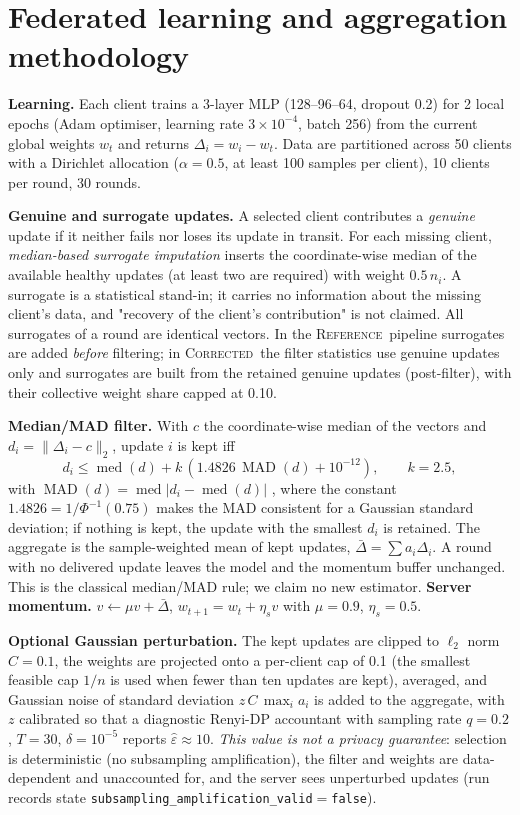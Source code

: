 \documentclass[preprint,12pt,times,numafflabel]{elsarticle}
\newcommand{\RefA}{\textsc{Reference}}
\newcommand{\Cor}{\textsc{Corrected}}
\begin{document}
\section{Federated learning and aggregation methodology}
\label{sec:method}
\textbf{Learning.} Each client trains a 3-layer MLP (128--96--64, dropout 0.2) for 2 local epochs (Adam optimiser, learning rate $3\!\times\!10^{-4}$, batch 256) from the current global weights $w_t$ and returns $\Delta_i=w_i-w_t$. Data are partitioned across 50 clients with a Dirichlet allocation \cite{hsu2019measuring} ($\alpha=0.5$, at least 100 samples per client), 10 clients per round, 30 rounds.

\textbf{Genuine and surrogate updates.} A selected client contributes a \emph{genuine} update if it neither fails nor loses its update in transit. For each missing client, \emph{median-based surrogate imputation} inserts the coordinate-wise median of the available healthy updates (at least two are required) with weight $0.5\,n_i$. A surrogate is a statistical stand-in; it carries no information about the missing client's data, and "recovery of the client's contribution" is not claimed. All surrogates of a round are identical vectors. In the \RefA\ pipeline surrogates are added \emph{before} filtering; in \Cor\ the filter statistics use genuine updates only and surrogates are built from the retained genuine updates (post-filter), with their collective weight share capped at 0.10.

\textbf{Median/MAD filter.} With $c$ the coordinate-wise median of the vectors and $d_i=\lVert\Delta_i-c\rVert_2$, update $i$ is kept iff
\begin{equation}
d_i\le\operatorname{med}(d)+k\,(1.4826\,\operatorname{MAD}(d)+10^{-12}),\qquad k=2.5,
\end{equation}
with $\operatorname{MAD}(d)=\operatorname{med}|d_i-\operatorname{med}(d)|$ \cite{rousseeuw1993mad}, where the constant $1.4826=1/\Phi^{-1}(0.75)$ makes the MAD consistent for a Gaussian standard deviation; if nothing is kept, the update with the smallest $d_i$ is retained. The aggregate is the sample-weighted mean of kept updates, $\bar\Delta=\sum a_i\Delta_i$. A round with no delivered update leaves the model and the momentum buffer unchanged. This is the classical median/MAD rule; we claim no new estimator. \textbf{Server momentum.} $v\leftarrow\mu v+\bar\Delta$, $w_{t+1}=w_t+\eta_s v$ with $\mu=0.9$, $\eta_s=0.5$.

\textbf{Optional Gaussian perturbation.} The kept updates are clipped to $\ell_2$ norm $C=0.1$, the weights are projected onto a per-client cap of 0.1 (the smallest feasible cap $1/n$ is used when fewer than ten updates are kept), averaged, and Gaussian noise of standard deviation $z\,C\,\max_i a_i$ is added to the aggregate, with $z$ calibrated so that a diagnostic Renyi-DP accountant \cite{mironov2017renyi,zhu2019poisson} with sampling rate $q=0.2$, $T=30$, $\delta=10^{-5}$ reports $\hat\varepsilon\approx10$. \emph{This value is not a privacy guarantee}: selection is deterministic (no subsampling amplification), the filter and weights are data-dependent and unaccounted for, and the server sees unperturbed updates (run records state \texttt{subsampling\_amplification\_valid}$=$\texttt{false}).
\end{document}
